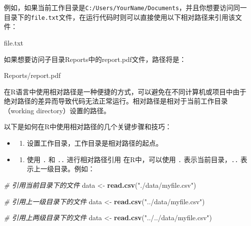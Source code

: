 \documentclass[
]{book}
\newenvironment{Shaded}{\begin{snugshade}}{\end{snugshade}}
\newcommand{\CommentTok}[1]{\textcolor[rgb]{0.56,0.35,0.01}{\textit{#1}}}
\newcommand{\ExtensionTok}[1]{#1}
\newcommand{\FunctionTok}[1]{\textcolor[rgb]{0.13,0.29,0.53}{\textbf{#1}}}
\newcommand{\NormalTok}[1]{#1}
\newcommand{\OtherTok}[1]{\textcolor[rgb]{0.56,0.35,0.01}{#1}}
\newcommand{\StringTok}[1]{\textcolor[rgb]{0.31,0.60,0.02}{#1}}
\providecommand{\tightlist}{%
  \setlength{\itemsep}{0pt}\setlength{\parskip}{0pt}}
\begin{document}
例如，如果当前工作目录是\texttt{C:/Users/YourName/Documents}，并且你想要访问同一目录下的\texttt{file.txt}文件，在运行代码时则可以直接使用以下相对路径来引用该文件：

\begin{Shaded}
\begin{Highlighting}[]
\ExtensionTok{file.txt}
\end{Highlighting}
\end{Shaded}

如果想要访问子目录Reports中的report.pdf文件，路径将是：

\begin{Shaded}
\begin{Highlighting}[]
\ExtensionTok{Reports/report.pdf}
\end{Highlighting}
\end{Shaded}

在R语言中使用相对路径是一种便捷的方式，可以避免在不同计算机或项目中由于绝对路径的差异而导致代码无法正常运行。相对路径是相对于当前工作目录（working directory）设置的路径。

以下是如何在R中使用相对路径的几个关键步骤和技巧：

\begin{itemize}
\item
  \begin{enumerate}
  \def\labelenumi{\arabic{enumi}.}
  \tightlist
  \item
    设置工作目录，工作目录是相对路径的起点。
  \end{enumerate}
\item
  \begin{enumerate}
  \def\labelenumi{\arabic{enumi}.}
  \setcounter{enumi}{1}
  \tightlist
  \item
    使用 \texttt{.} 和 \texttt{..} 进行相对路径引用
    在R中，可以使用 \texttt{.} 表示当前目录，\texttt{..} 表示上一级目录。例如：
  \end{enumerate}
\end{itemize}

\begin{Shaded}
\begin{Highlighting}[]
\CommentTok{\# 引用当前目录下的文件}
\NormalTok{data }\OtherTok{\textless{}{-}} \FunctionTok{read.csv}\NormalTok{(}\StringTok{"./data/myfile.csv"}\NormalTok{)}

\CommentTok{\# 引用上一级目录下的文件}
\NormalTok{data }\OtherTok{\textless{}{-}} \FunctionTok{read.csv}\NormalTok{(}\StringTok{"../data/myfile.csv"}\NormalTok{)}

\CommentTok{\# 引用上两级目录下的文件}
\NormalTok{data }\OtherTok{\textless{}{-}} \FunctionTok{read.csv}\NormalTok{(}\StringTok{"../../data/myfile.csv"}\NormalTok{)}
\end{Highlighting}
\end{Shaded}
\end{document}
